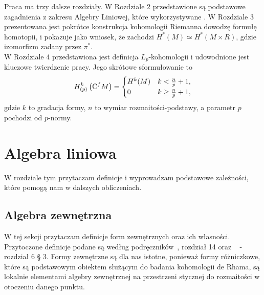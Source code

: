 \documentclass[licencjacka]{pracamgr}
\theoremstyle{definition}
\theoremstyle{definition}
\theoremstyle{plain}
\theoremstyle{plain}
\theoremstyle{plain}
\theoremstyle{plain}
\def\cfm{\ensuremath\mathrm{C}^fM}
\begin{document}
Praca ma trzy dalsze rozdziały.  W Rozdziale 2 przedstawione są podstawowe
zagadnienia z zakresu Algebry Liniowej, które wykorzystywane . 
W Rozdziale 3 prezentowana jest pokrótce konstrukcja kohomologii Riemanna 
dowodzę formułę homotopii, i pokazuje jako wniosek, że zachodzi
$H^*(M) \simeq H^*(M\times R)$, gdzie izomorfizm zadany przez $\pi^*$. \\
W Rozdziale 4 przedstawiona jest definicja $L_p$-kohomologii i udowodnione jest
kluczowe twierdzenie pracy. Jego skrótowe sformułowanie to 
\begin{equation}
    H_{(p)}^k \left( \cfm \right) = \begin{cases}
      H^k(M) & k < \frac{n}{p} + 1, \\
      0 & k \geq  \frac{n}{p} + 1, \\
      \end{cases}
\end{equation}
gdzie $k$ to gradacja formy, $n$ to wymiar rozmaitości-podstawy, a parametr
$p$ pochodzi od $p$-normy. \\




\chapter{Algebra liniowa}
W rozdziale tym przytaczam definicje i wyprowadzam podstawowe zależności, które
pomogą nam w dalszych obliczeniach. \\


\section{Algebra zewnętrzna}\label{exterior-algebra-chapter}
W tej sekcji przytaczam definicje form zewnętrznych oraz ich własności. 
 Przytoczone
definicje podane są według podręczników~\cite{lee}, rozdział 14 oraz
~\cite{kostrikin} - rozdział 6 § 3. 
Formy zewnętrzne są dla nas istotne, ponieważ formy różniczkowe, które 
są podstawowym obiektem służącym do badania kohomologii de Rhama, 
są lokalnie elementami algebry zewnętrznej na przestrzeni stycznej
do rozmaitości w otoczeniu danego punktu. \\
\end{document}
